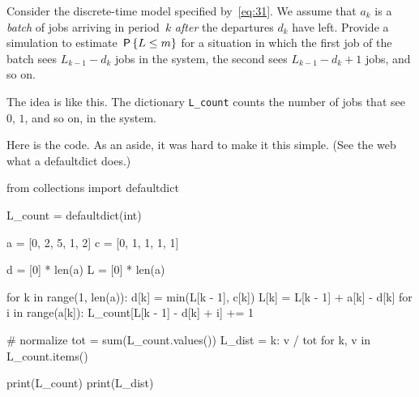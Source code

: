 \documentclass[stochastic-or.tex]{subfiles}
\begin{document}
\begin{exercise}\label{ex:l-166}
Consider 
 the discrete-time model specified by~\cref{eq:31}. We assume that $a_{k}$ is a \emph{batch} of jobs arriving in period~$k$ \emph{after} the departures $d_k$ have left.
Provide a simulation to estimate  $\,\mathsf{P}\left\{L\leq m\right\}$ for a situation in which  the first job of the batch sees $L_{k-1} - d_k$ jobs in the system,
the second sees $L_{k-1}-d_k + 1$ jobs, and so on.
\begin{solution}
The idea is like this. The dictionary \texttt{L_count} counts the number of jobs that see~$0$, $1$, and so on, in the system.

Here is the code. As an aside, it was hard to make it this simple. (See  the web what a defaultdict does.)
\begin{python}
from collections import defaultdict

L_count = defaultdict(int)

a = [0, 2, 5, 1, 2]
c = [0, 1, 1, 1, 1]

d = [0] * len(a)
L = [0] * len(a)

for k in range(1, len(a)):
    d[k] = min(L[k - 1], c[k])
    L[k] = L[k - 1] + a[k] - d[k]
    for i in range(a[k]):
        L_count[L[k - 1] - d[k] + i] += 1


# normalize
tot = sum(L_count.values())
L_dist = {k: v / tot for k, v in L_count.items()}

print(L_count)
print(L_dist)
\end{python}

\end{solution}
\end{exercise}



\end{document}
